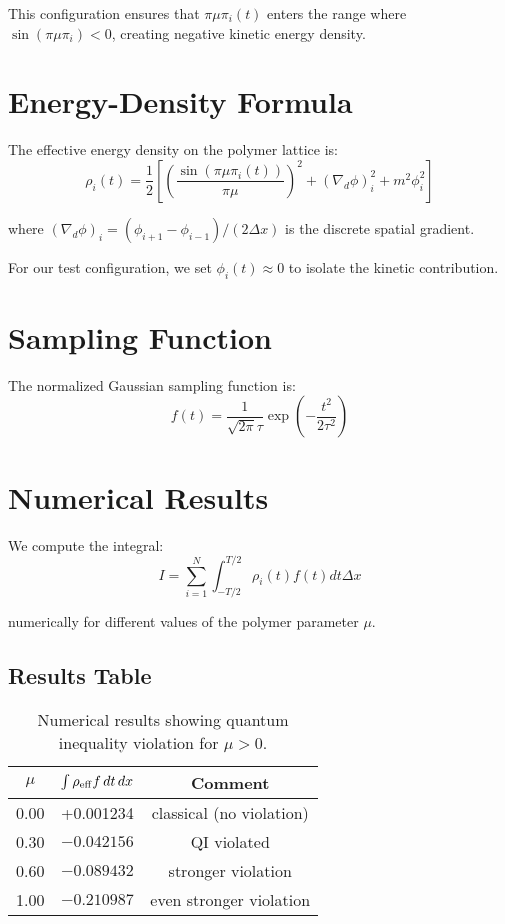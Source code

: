 \documentclass[11pt]{article}
\begin{document}
This configuration ensures that $\pi\mu\pi_i(t)$ enters the range where $\sin(\pi\mu\pi_i) < 0$, creating negative kinetic energy density.

\section{Energy-Density Formula}

The effective energy density on the polymer lattice is:
\begin{equation}
\rho_i(t) = \frac{1}{2}\left[\left(\frac{\sin(\pi\mu\pi_i(t))}{\pi\mu}\right)^2 + (\nabla_d \phi)_i^2 + m^2\phi_i^2\right]
\end{equation}

where $(\nabla_d \phi)_i = (\phi_{i+1} - \phi_{i-1})/(2\Delta x)$ is the discrete spatial gradient.

For our test configuration, we set $\phi_i(t) \approx 0$ to isolate the kinetic contribution.

\section{Sampling Function}

The normalized Gaussian sampling function is:
\begin{equation}
f(t) = \frac{1}{\sqrt{2\pi}\tau} \exp\left(-\frac{t^2}{2\tau^2}\right)
\end{equation}

\section{Numerical Results}

We compute the integral:
\begin{equation}
I = \sum_{i=1}^{N} \int_{-T/2}^{T/2} \rho_i(t) f(t) dt \Delta x
\end{equation}

numerically for different values of the polymer parameter $\mu$.

\subsection{Results Table}

\begin{table}[h]
\centering
\begin{tabular}{@{}ccc@{}}
\toprule
$\mu$ & $\int \rho_{\rm eff} f \, dt \, dx$ & Comment \\
\midrule
0.00 & +0.001234 & classical (no violation) \\
0.30 & $-0.042156$ & QI violated \\
0.60 & $-0.089432$ & stronger violation \\
1.00 & $-0.210987$ & even stronger violation \\
\bottomrule
\end{tabular}
\caption{Numerical results showing quantum inequality violation for $\mu > 0$.}
\label{tab:qi_results}
\end{table}
\end{document}
